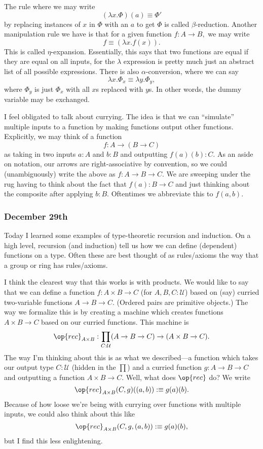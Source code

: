The rule where we may write
\[(\lambda x.\Phi)(a)\equiv\Phi'\]
by replacing instances of $x$ in $\Phi$ with an $a$ to get $\Phi$ is called $\beta$-reduction. Another manipulation rule we have is that for a given function $f:A\to B,$ we may write
\[f\equiv(\lambda x.f(x)).\]
This is called $\eta$-expansion. Essentially, this says that two functions are equal if they are equal on all inputs, for the $\lambda$ expression is pretty much just an abstract list of all possible expressions. There is also $\alpha$-conversion, where we can say
\[\lambda x.\Phi_x\equiv\lambda y.\Phi_y,\]
where $\Phi_y$ is just $\Phi_x$ with all $x$s replaced with $y$s. In other words, the dummy variable may be exchanged.

I feel obligated to talk about currying. The idea is that we can ``simulate'' multiple inputs to a function by making functions output other functions. Explicitly, we may think of a function
\[f:A\to(B\to C)\]
as taking in two inputs $a:A$ and $b:B$ and outputting $f(a)(b):C.$ As an aside on notation, our arrows are right-associative by convention, so we could (unambiguously) write the above as $f:A\to B\to C.$ We are sweeping under the rug having to think about the fact that $f(a):B\to C$ and just thinking about the composite after applying $b:B.$ Oftentimes we abbreviate this to $f(a,b).$

\subsubsection{December 29th}
Today I learned some examples of type-theoretic recursion and induction. On a high level, recursion (and induction) tell us how we can define (dependent) functions on a type. Often these are best thought of as rules/axioms the way that a group or ring has rules/axioms.

I think the clearest way that this works is with products. We would like to say that we can define a function $f:A\times B\to C$ (for $A,B,C:\mathcal U$) based on (say) curried two-variable functions $A\to B\to C.$ (Ordered pairs are primitive objects.) The way we formalize this is by creating a machine which creates functions $A\times B\to C$ based on our curried functions. This machine is
\[\op{rec}_{A\times B}:\prod_{C:\mathcal U}(A\to B\to C)\to(A\times B\to C).\]
The way I'm thinking about this is as what we described---a function which takes our output type $C:\mathcal U$ (hidden in the $\prod$) and a curried function $g:A\to B\to C$ and outputting a function $A\times B\to C.$ Well, what does $\op{rec}$ do? We write
\[\op{rec}_{A\times B}(C,g)((a,b)):\equiv g(a)(b).\]
Because of how loose we're being with currying over functions with multiple inputs, we could also think about this like
\[\op{rec}_{A\times B}(C,g,(a,b)):\equiv g(a)(b),\]
but I find this less enlightening.

